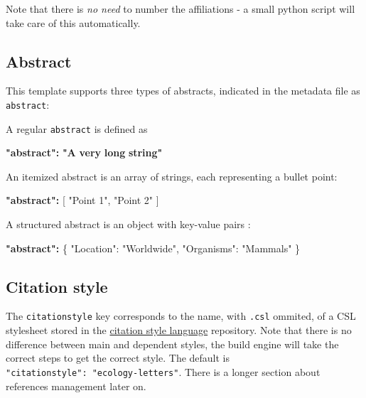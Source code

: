\documentclass[11pt]{article}
\newenvironment{Shaded}{\begin{snugshade}}{\end{snugshade}}
\newcommand{\DataTypeTok}[1]{\textcolor[rgb]{0.13,0.29,0.53}{#1}}
\newcommand{\StringTok}[1]{\textcolor[rgb]{0.31,0.60,0.02}{#1}}
\newcommand{\OtherTok}[1]{\textcolor[rgb]{0.56,0.35,0.01}{#1}}
\newcommand{\FunctionTok}[1]{\textcolor[rgb]{0.00,0.00,0.00}{#1}}
\newcommand{\ErrorTok}[1]{\textcolor[rgb]{0.64,0.00,0.00}{\textbf{#1}}}
\begin{document}
Note that there is \emph{no need} to number the affiliations - a small
python script will take care of this automatically.

\hypertarget{abstract}{%
\subsection{Abstract}\label{abstract}}

This template supports three types of abstracts, indicated in the
metadata file as \texttt{abstract}:

A regular \texttt{abstract} is defined as

\begin{Shaded}
\begin{Highlighting}[]
\ErrorTok{"abstract":} \ErrorTok{"A} \ErrorTok{very} \ErrorTok{long} \ErrorTok{string"}
\end{Highlighting}
\end{Shaded}

An itemized abstract is an array of strings, each representing a bullet
point:

\begin{Shaded}
\begin{Highlighting}[]
\ErrorTok{"abstract":} \OtherTok{[}
    \StringTok{"Point 1"}\OtherTok{,}
    \StringTok{"Point 2"}
\OtherTok{]}
\end{Highlighting}
\end{Shaded}

A structured abstract is an object with key-value pairs :

\begin{Shaded}
\begin{Highlighting}[]
\ErrorTok{"abstract":} \FunctionTok{\{}
    \DataTypeTok{"Location"}\FunctionTok{:} \StringTok{"Worldwide"}\FunctionTok{,}
    \DataTypeTok{"Organisms"}\FunctionTok{:} \StringTok{"Mammals"}
\FunctionTok{\}}
\end{Highlighting}
\end{Shaded}

\hypertarget{citation-style}{%
\subsection{Citation style}\label{citation-style}}

The \texttt{citationstyle} key corresponds to the name, with
\texttt{.csl} ommited, of a CSL stylesheet stored in the
\href{https://github.com/citation-style-language/}{citation style
language} repository. Note that there is no difference between main and
dependent styles, the build engine will take the correct steps to get
the correct style. The default is
\texttt{"citationstyle":\ "ecology-letters"}. There is a longer section
about references management later on.
\end{document}
